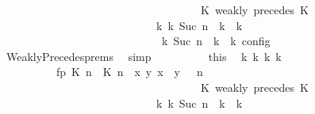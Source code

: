 \begin{isabellebody}
\ \ \ \ \ \ \ \ \ \ \ \ \ \ \ \ \ \ \ \ \ \ \ \ \ \ \ \ \ \ \ \ \ \ {\isasymturnstile}\ {\isasymPsi}\ {\isasymtriangleright}\ {\isacharparenleft}{\isacharparenleft}K\ weakly\ precedes\ K\ {\isacharhash}\ {\isasymPhi}{\isacharparenright}{\isacharparenright}\isanewline
\ \ \ \ \ \ \ \ \ \ \ \ \ \ \ \ \ \ \ \ \ \ \ \ \ \ \ \ \ {\isasymhookrightarrow}\isactrlbsup k\isactrlesup \ {\isacharparenleft}{\isasymGamma}\isactrlsub k{\isacharcomma}\ Suc\ n\ {\isasymturnstile}\ {\isasymPsi}\isactrlsub k\ {\isasymtriangleright}\ {\isasymPhi}\isactrlsub k{\isacharparenright}{\isacharparenright}\isanewline
\ \ \ \ \ \ \ \ \ \ \ \ \ \ \ \ \ \ \ \ \ \ \ \ \ \ {\isasymand}\ {\isacharparenleft}{\isasymrho}\ {\isasymin}\ {\isasymlbrakk}\ {\isasymGamma}\isactrlsub k{\isacharcomma}\ Suc\ n\ {\isasymturnstile}\ {\isasymPsi}\isactrlsub k\ {\isasymtriangleright}\ {\isasymPhi}\isactrlsub k\ {\isasymrbrakk}\isactrlsub c\isactrlsub o\isactrlsub n\isactrlsub f\isactrlsub i\isactrlsub g{\isacharparenright}{\isacartoucheclose}\isanewline
\ \ \ \ \ \ \ \ \ \ \isamarkupfalse%
\ \ WeaklyPrecedes{\isachardot}prems\ \isamarkupfalse%
\ simp\isanewline
\ \ \ \ \ \ \ \ \isamarkupfalse%
\ this\ \isamarkupfalse%
\ {\isasymGamma}\isactrlsub k\ {\isasymPsi}\isactrlsub k\ {\isasymPhi}\isactrlsub k\ k\isanewline
\ \ \ \ \ \ \ \ \ \ \ fp{\isacharcolon}{\isacartoucheopen}{\isacharparenleft}{\isacharparenleft}{\isacharparenleft}{\isasymlceil}{\isacharhash}\isactrlsup {\isasymle}\ K\ n{\isacharcomma}\ {\isacharhash}\isactrlsup {\isasymle}\ K\ n{\isasymrceil}\ {\isasymin}\ {\isacharparenleft}{\isasymlambda}{\isacharparenleft}x{\isacharcomma}\ y{\isacharparenright}{\isachardot}\ x\ {\isasymle}\ y{\isacharparenright}{\isacharparenright}\ {\isacharhash}\ {\isasymGamma}{\isacharparenright}{\isacharcomma}\ n\isanewline
\ \ \ \ \ \ \ \ \ \ \ \ \ \ \ \ \ \ \ \ \ \ \ \ \ \ \ \ \ \ \ \ \ \ {\isasymturnstile}\ {\isasymPsi}\ {\isasymtriangleright}\ {\isacharparenleft}{\isacharparenleft}K\ weakly\ precedes\ K\ {\isacharhash}\ {\isasymPhi}{\isacharparenright}{\isacharparenright}\isanewline
\ \ \ \ \ \ \ \ \ \ \ \ \ \ \ \ \ \ \ \ \ \ \ \ \ \ \ \ \ {\isasymhookrightarrow}\isactrlbsup k\isactrlesup \ {\isacharparenleft}{\isasymGamma}\isactrlsub k{\isacharcomma}\ Suc\ n\ {\isasymturnstile}\ {\isasymPsi}\isactrlsub k\ {\isasymtriangleright}\ {\isasymPhi}\isactrlsub k{\isacharparenright}{\isacartoucheclose}\isanewline

\end{isabellebody}
